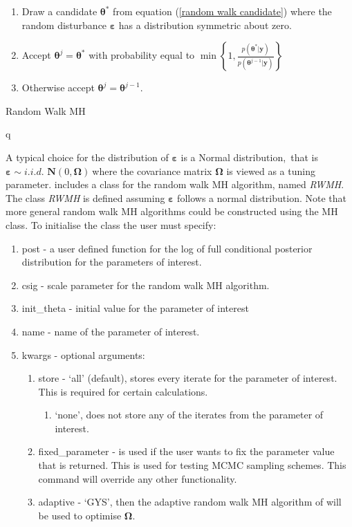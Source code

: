 \documentclass[article]{jss}
\begin{document}
%
\begin{algorithm}[H]
  \begin{enumerate}
  \item Draw a candidate $\bm{\theta}^{\ast}$ from equation
    (\ref{random walk candidate}) where the random disturbance
    $\bm{\varepsilon}$ has a distribution symmetric about zero.
  \item Accept $\bm{\theta}^{j}=\bm{\theta}^{\ast}$ with probability
    equal to $\min\left\{
      1,\frac{p\left(\bm{\theta}^{\ast}|\bm{y}\right)}{p\left(\bm{\theta}^{j-1}|\bm{y}\right)}\right\}
    $
  \item Otherwise accept $\bm{\theta}^{j}=\bm{\theta}^{j-1}.$
  \end{enumerate}
  \caption{Random Walk MH}
\label{alg:rwmh}q
\end{algorithm}


A typical choice for the distribution of $\bm{\bm{\varepsilon}}$ is a
Normal distribution,\emph{\ }that is $\bm{\varepsilon\sim}i.i.d.$
$\bm{N}\left(0,\bm{\Omega}\right)\ $where the covariance matrix
$\bm{\Omega}$ is viewed as a tuning parameter.  includes a
class for the random walk MH algorithm, named \emph{RWMH}. The class
\emph{RWMH} is defined assuming $\bm{\varepsilon}$ follows a normal
distribution. Note that more general random walk MH algorithms could
be constructed using the MH class. To initialise the class the user
must specify:
\begin{enumerate}
\item post - a user defined function for the log of full conditional
  posterior distribution for the parameters of interest.
\item csig - scale parameter for the random walk MH algorithm.
\item init\_theta - initial value for the parameter of interest
\item name - name of the parameter of interest.
\item kwargs - optional arguments:

  \begin{enumerate}
  \item store - `all' (default), stores every iterate for the
    parameter of interest. This is required for certain calculations.

\begin{enumerate}
\item `none', does not store any of the iterates from the parameter of
  interest.
\end{enumerate}
\item fixed\_parameter - is used if the user wants to fix the
  parameter value that is returned. This is used for testing MCMC
  sampling schemes.  This command will override any other
  functionality.
\item adaptive - `GYS', then the adaptive random walk MH algorithm of
  \citet{GarthwaiteYanScisson2010} will be used to optimise
  $\bm{\Omega}.$
\end{enumerate}
\end{enumerate}
\end{document}
